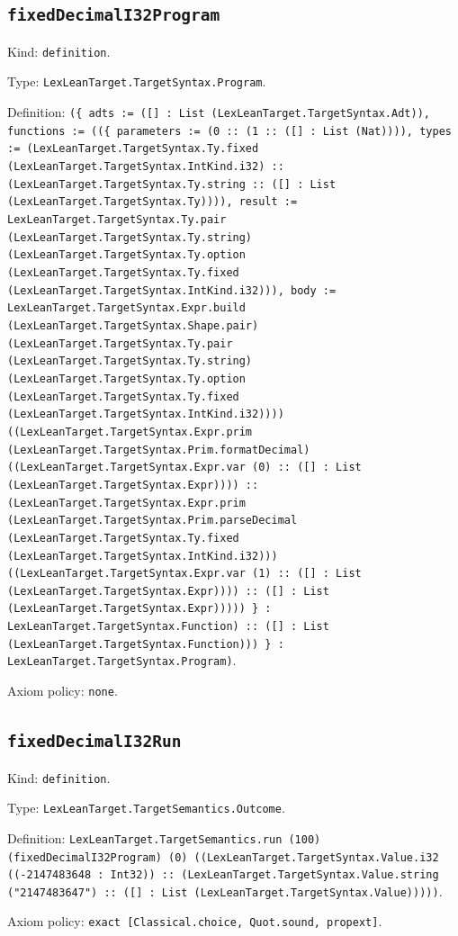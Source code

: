 \documentclass[11pt]{article}
\begin{document}
\subsection*{\texttt{fixedDecimalI32Program}}
\noindent Kind: \texttt{definition}.\par
\noindent Type: \texttt{LexLeanTarget.TargetSyntax.Program}.\par
\noindent Definition: \texttt{(\{ adts := ([] : List (LexLeanTarget.TargetSyntax.Adt)), functions := ((\{ parameters := (0 :: (1 :: ([] : List (Nat)))), types := (LexLeanTarget.TargetSyntax.Ty.fixed (LexLeanTarget.TargetSyntax.IntKind.i32) :: (LexLeanTarget.TargetSyntax.Ty.string :: ([] : List (LexLeanTarget.TargetSyntax.Ty)))), result := LexLeanTarget.TargetSyntax.Ty.pair (LexLeanTarget.TargetSyntax.Ty.string) (LexLeanTarget.TargetSyntax.Ty.option (LexLeanTarget.TargetSyntax.Ty.fixed (LexLeanTarget.TargetSyntax.IntKind.i32))), body := LexLeanTarget.TargetSyntax.Expr.build (LexLeanTarget.TargetSyntax.Shape.pair) (LexLeanTarget.TargetSyntax.Ty.pair (LexLeanTarget.TargetSyntax.Ty.string) (LexLeanTarget.TargetSyntax.Ty.option (LexLeanTarget.TargetSyntax.Ty.fixed (LexLeanTarget.TargetSyntax.IntKind.i32)))) ((LexLeanTarget.TargetSyntax.Expr.prim (LexLeanTarget.TargetSyntax.Prim.formatDecimal) ((LexLeanTarget.TargetSyntax.Expr.var (0) :: ([] : List (LexLeanTarget.TargetSyntax.Expr)))) :: (LexLeanTarget.TargetSyntax.Expr.prim (LexLeanTarget.TargetSyntax.Prim.parseDecimal (LexLeanTarget.TargetSyntax.Ty.fixed (LexLeanTarget.TargetSyntax.IntKind.i32))) ((LexLeanTarget.TargetSyntax.Expr.var (1) :: ([] : List (LexLeanTarget.TargetSyntax.Expr)))) :: ([] : List (LexLeanTarget.TargetSyntax.Expr))))) \} : LexLeanTarget.TargetSyntax.Function) :: ([] : List (LexLeanTarget.TargetSyntax.Function))) \} : LexLeanTarget.TargetSyntax.Program)}.\par
\noindent Axiom policy: \texttt{none}.\par
\subsection*{\texttt{fixedDecimalI32Run}}
\noindent Kind: \texttt{definition}.\par
\noindent Type: \texttt{LexLeanTarget.TargetSemantics.Outcome}.\par
\noindent Definition: \texttt{LexLeanTarget.TargetSemantics.run (100) (fixedDecimalI32Program) (0) ((LexLeanTarget.TargetSyntax.Value.i32 ((-2147483648 : Int32)) :: (LexLeanTarget.TargetSyntax.Value.string ("2147483647") :: ([] : List (LexLeanTarget.TargetSyntax.Value)))))}.\par
\noindent Axiom policy: \texttt{exact [Classical.choice, Quot.sound, propext]}.\par
\end{document}

